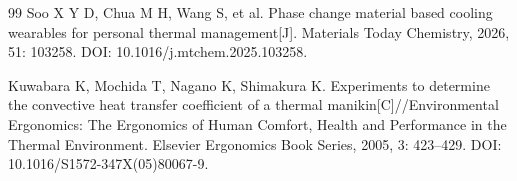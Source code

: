 \begin{thebibliography}{99}
 Soo X Y D, Chua M H, Wang S, et al. Phase change material based cooling wearables for personal thermal management[J]. Materials Today Chemistry, 2026, 51: 103258. DOI: 10.1016/j.mtchem.2025.103258.

 Kuwabara K, Mochida T, Nagano K, Shimakura K. Experiments to determine the convective heat transfer coefficient of a thermal manikin[C]//Environmental Ergonomics: The Ergonomics of Human Comfort, Health and Performance in the Thermal Environment. Elsevier Ergonomics Book Series, 2005, 3: 423--429. DOI: 10.1016/S1572-347X(05)80067-9.

\end{thebibliography}
\endgroup
